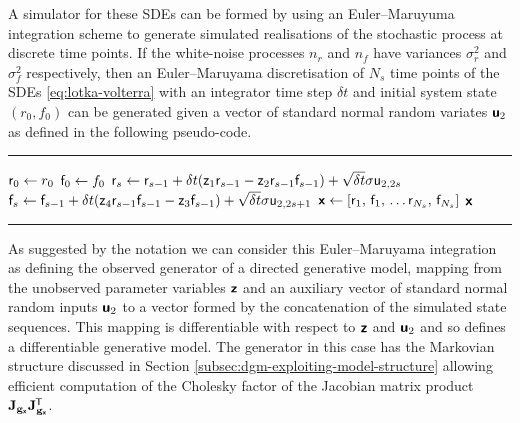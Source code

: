 A simulator for these \acp{SDE} can be formed by using an Euler--Maruyuma \citep{kloeden1992numerical} integration scheme to generate simulated realisations of the stochastic process at discrete time points. If the white-noise processes $n_r$ and $n_f$ have variances $\sigma_r^2$ and $\sigma_f^2$ respectively, then an Euler--Maruyama discretisation of $N_s$ time points of the \acp{SDE} \ref{eq:lotka-volterra} with an integrator time step $\delta t$ and initial system state $(r_0,f_0)$ can be generated given a vector of standard normal random variates $\boldsymbol{\mathsf{u}}_2$ as defined in the following pseudo-code.
\vspace{3mm}
\hrule
\begin{algorithmic}
\small
{}
  \State $\mathsf{r}_0 \gets r_0$  
  \State $\mathsf{f}_0 \gets f_0$
    \State $\mathsf{r}_s \gets \mathsf{r}_{s-1} + \delta t(\mathsf{z}_1 \mathsf{r}_{s-1} - \mathsf{z}_2 \mathsf{r}_{s-1} \mathsf{f}_{s-1}) + \sqrt{\delta t} \sigma  \mathsf{u}_{2,2s}$
    \State $\mathsf{f}_s \gets \mathsf{f}_{s-1} + \delta t(\mathsf{z}_4 \mathsf{r}_{s-1} \mathsf{f}_{s-1} - \mathsf{z}_3 \mathsf{f}_{s-1}) + \sqrt{\delta t} \sigma  \mathsf{u}_{2,2s+1}$
  \EndFor
  \State $\rvct{x} \gets \lsb \rvar{r}_1,\, \rvar{f}_1, \,\dots \rvar{r}_{N_s},\,\rvar{f}_{N_s} \rsb$
  \State \Return $\boldsymbol{\mathsf{x}}$
\EndFunction
\end{algorithmic}
\vspace{0mm}
\hrule
\vspace{1mm}
As suggested by the notation we can consider this Euler--Maruyama integration as defining the observed generator of a directed generative model, mapping from the unobserved parameter variables $\boldsymbol{\mathsf{z}}$ and an auxiliary vector of standard normal random inputs $\boldsymbol{\mathsf{u}}_2$ to a vector formed by the concatenation of the simulated state sequences. This mapping is differentiable with respect to $\boldsymbol{\mathsf{z}}$ and $\boldsymbol{\mathsf{u}}_2$ and so defines a differentiable generative model. The generator in this case has the Markovian structure discussed in Section \ref{subsec:dgm-exploiting-model-structure} allowing efficient computation of the Cholesky factor of the Jacobian matrix product $\mathbf{J}_{{\mathbf{g}}_{\boldsymbol{\mathsf{x}}}}\mathbf{J}_{{\mathbf{g}}_{\boldsymbol{\mathsf{x}}}}^{\mkern-1.5mu\mathsf{T}}$.

